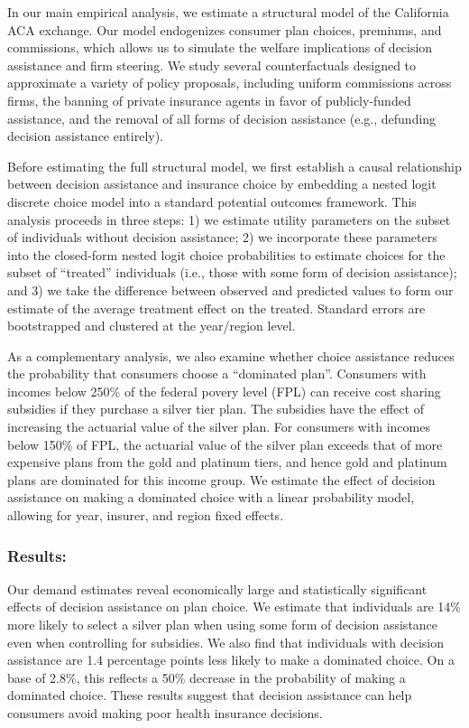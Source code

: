 \documentclass[
  11pt,
]{article}
\begin{document}
In our main empirical analysis, we estimate a structural model of the California ACA exchange. Our model endogenizes consumer plan choices, premiums, and commissions, which allows us to simulate the welfare implications of decision assistance and firm steering. We study several counterfactuals designed to approximate a variety of policy proposals, including uniform commissions across firms, the banning of private insurance agents in favor of publicly-funded assistance, and the removal of all forms of decision assistance (e.g., defunding decision assistance entirely).

Before estimating the full structural model, we first establish a causal relationship between decision assistance and insurance choice by embedding a nested logit discrete choice model into a standard potential outcomes framework. This analysis proceeds in three steps: 1) we estimate utility parameters on the subset of individuals without decision assistance; 2) we incorporate these parameters into the closed-form nested logit choice probabilities to estimate choices for the subset of ``treated'' individuals (i.e., those with some form of decision assistance); and 3) we take the difference between observed and predicted values to form our estimate of the average treatment effect on the treated. Standard errors are bootstrapped and clustered at the year/region level.

As a complementary analysis, we also examine whether choice assistance reduces the probability that consumers choose a ``dominated plan''. Consumers with incomes below 250\% of the federal povery level (FPL) can receive cost sharing subsidies if they purchase a silver tier plan. The subsidies have the effect of increasing the actuarial value of the silver plan. For consumers with incomes below 150\% of FPL, the actuarial value of the silver plan exceeds that of more expensive plans from the gold and platinum tiers, and hence gold and platinum plans are dominated for this income group. We estimate the effect of decision assistance on making a dominated choice with a linear probability model, allowing for year, insurer, and region fixed effects.

\hypertarget{results}{%
\subsubsection{Results:}\label{results}}

Our demand estimates reveal economically large and statistically significant effects of decision assistance on plan choice. We estimate that individuals are 14\% more likely to select a silver plan when using some form of decision assistance even when controlling for subsidies. We also find that individuals with decision assistance are 1.4 percentage points less likely to make a dominated choice. On a base of 2.8\%, this reflects a 50\% decrease in the probability of making a dominated choice. These results suggest that decision assistance can help consumers avoid making poor health insurance decisions.
\end{document}
